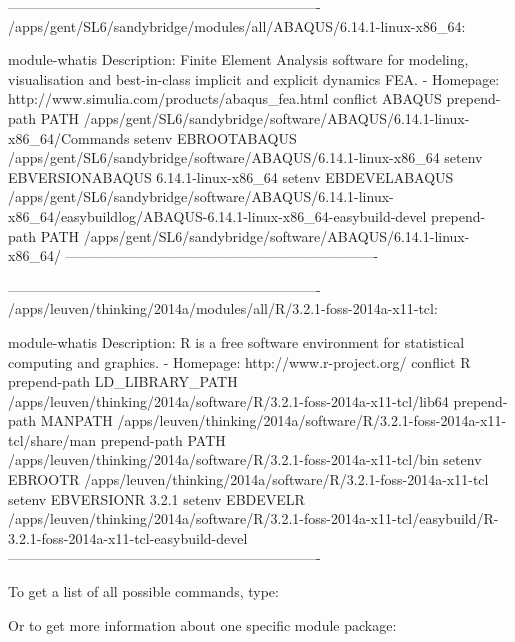 \fi
\ifbrussel
\begin{prompt}
-------------------------------------------------------------------
/apps/gent/SL6/sandybridge/modules/all/ABAQUS/6.14.1-linux-x86_64:

module-whatis    Description: Finite Element Analysis software for modeling, visualisation and best-in-class implicit and explicit dynamics FEA. - Homepage: http://www.simulia.com/products/abaqus_fea.html
conflict     ABAQUS
prepend-path PATH /apps/gent/SL6/sandybridge/software/ABAQUS/6.14.1-linux-x86_64/Commands
setenv       EBROOTABAQUS /apps/gent/SL6/sandybridge/software/ABAQUS/6.14.1-linux-x86_64
setenv       EBVERSIONABAQUS 6.14.1-linux-x86_64
setenv       EBDEVELABAQUS /apps/gent/SL6/sandybridge/software/ABAQUS/6.14.1-linux-x86_64/easybuildlog/ABAQUS-6.14.1-linux-x86_64-easybuild-devel
prepend-path PATH /apps/gent/SL6/sandybridge/software/ABAQUS/6.14.1-linux-x86_64/
-------------------------------------------------------------------
\end{prompt}
\fi
\ifleuven
\begin{prompt}
-------------------------------------------------------------------
/apps/leuven/thinking/2014a/modules/all/R/3.2.1-foss-2014a-x11-tcl:

module-whatis    Description: R is a free software environment for statistical computing and graphics. - Homepage: http://www.r-project.org/
conflict         R
prepend-path     LD_LIBRARY_PATH /apps/leuven/thinking/2014a/software/R/3.2.1-foss-2014a-x11-tcl/lib64
prepend-path     MANPATH /apps/leuven/thinking/2014a/software/R/3.2.1-foss-2014a-x11-tcl/share/man
prepend-path     PATH /apps/leuven/thinking/2014a/software/R/3.2.1-foss-2014a-x11-tcl/bin
setenv           EBROOTR /apps/leuven/thinking/2014a/software/R/3.2.1-foss-2014a-x11-tcl
setenv           EBVERSIONR 3.2.1
setenv           EBDEVELR /apps/leuven/thinking/2014a/software/R/3.2.1-foss-2014a-x11-tcl/easybuild/R-3.2.1-foss-2014a-x11-tcl-easybuild-devel
-------------------------------------------------------------------
\end{prompt}
\fi


To get a list of all possible commands, type:

\begin{prompt}
\end{prompt}

Or to get more information about one specific module package:

